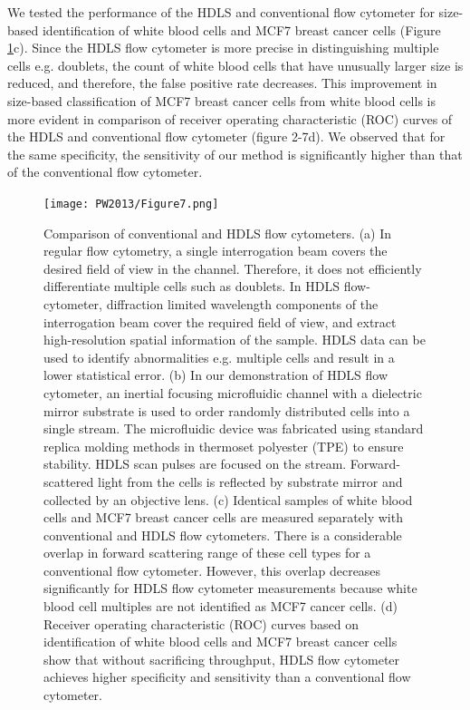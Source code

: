 We tested the performance of the HDLS and conventional flow cytometer for size-based identification of white blood cells and MCF7 breast cancer cells (Figure \ref{fig:PW2013_Figure7}c). Since the HDLS flow cytometer is more precise in distinguishing multiple cells e.g. doublets, the count of white blood cells that have unusually larger size is reduced, and therefore, the false positive rate decreases. This improvement in size-based classification of MCF7 breast cancer cells from white blood cells is more evident in comparison of receiver operating characteristic (ROC) curves of the HDLS and conventional flow cytometer (figure 2-7d). We observed that for the same specificity, the sensitivity of our method is significantly higher than that of the conventional flow cytometer. 
 
\begin{figure}[htb!]
\centering
\texttt{[image: PW2013/Figure7.png]}
\caption{Comparison of conventional and HDLS flow cytometers. (a) In regular flow cytometry, a single interrogation beam covers the desired field of view in the channel. Therefore, it does not efficiently differentiate multiple cells such as doublets. In HDLS flow-cytometer, diffraction limited wavelength components of the interrogation beam cover the required field of view, and extract high-resolution spatial information of the sample. HDLS data can be used to identify abnormalities e.g. multiple cells and result in a lower statistical error. (b) In our demonstration of HDLS flow cytometer, an inertial focusing microfluidic channel with a dielectric mirror substrate is used to order randomly distributed cells into a single stream. The microfluidic device was fabricated using standard replica molding methods in thermoset polyester (TPE) to ensure stability. HDLS scan pulses are focused on the stream. Forward-scattered light from the cells is reflected by substrate mirror and collected by an objective lens. (c) Identical samples of white blood cells and MCF7 breast cancer cells are measured separately with conventional and HDLS flow cytometers. There is a considerable overlap in forward scattering range of these cell types for a conventional flow cytometer. However, this overlap decreases significantly for HDLS flow cytometer measurements because white blood cell multiples are not identified as MCF7 cancer cells. (d) Receiver operating characteristic (ROC) curves based on identification of white blood cells and MCF7 breast cancer cells show that without sacrificing throughput, HDLS flow cytometer achieves higher specificity and sensitivity than a conventional flow cytometer.}
\label{fig:PW2013_Figure7}
\end{figure}
